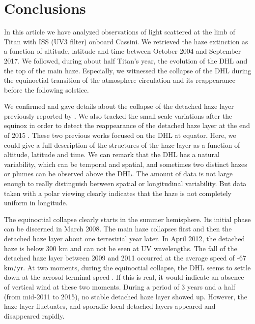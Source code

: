 \section{Conclusions}

In this article we have analyzed observations of light scattered at the limb of Titan with ISS (UV3 filter) onboard
Cassini. We retrieved the haze extinction as a function of altitude, latitude and time between October 2004 and
September 2017. We followed, during about half Titan's year, the evolution of the DHL and the top of the
main haze. Especially, we witnessed the collapse of the DHL during the equinoctial transition of the atmosphere
circulation and its reappearance before the following solstice.

We confirmed and gave details about the collapse of the detached haze layer previously reported by \cite{West2011}.
We also tracked the small scale variations after the equinox in order to detect the reappearance of the detached haze
layer at the end of 2015 \citep{West2018}. These two previous works focused on the DHL at equator. Here, we could give
a full description of the structures of the haze layer as a function of altitude, latitude and time. We can remark
that the DHL has a natural variability, which can be temporal and spatial, and sometimes two distinct hazes or plumes
can be observed above the DHL. The amount of data is not large enough to really distinguish between spatial or
longitudinal variability. But data taken with a polar viewing clearly indicates that the haze is not completely
uniform in longitude.

The equinoctial collapse clearly starts in the summer hemisphere. Its initial phase can be discerned in March
2008. The main haze collapses first and then the detached haze layer about one terrestrial year later. In April
2012, the detached haze is below 300 km and can not be seen at UV wavelengths.
The fall of the detached haze layer between 2009 and 2011 occurred at the average speed of -67 km/yr. At two moments,
during the equinoctial collapse, the DHL seems to settle down at the aerosol terminal speed
\citep[as reported by][]{West2018}. If this is real, it would indicate an absence of vertical wind at these two moments.
During a period of 3 years and a half (from mid-2011 to 2015), no stable detached haze layer showed up.
However, the haze layer fluctuates, and sporadic local detached layers appeared and disappeared rapidly.

